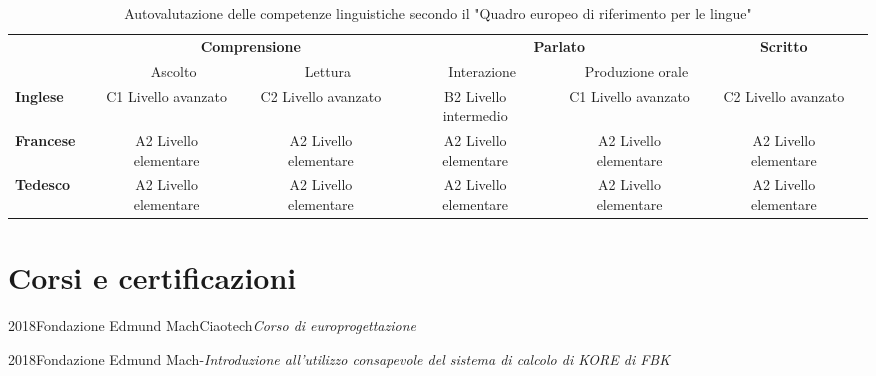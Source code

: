 \documentclass{curriculum}
\begin{document}
        \begin{table}[h]
        \centering
        \fontsize{8}{9}\selectfont
            \begin{tabular}{lccccccccccc}
            \toprule
\multicolumn{2}{c}{} & \multicolumn{4}{c}{\textbf{Comprensione}}                 & \multicolumn{4}{c}{\textbf{Parlato}}                              & \textbf{Scritto} &\\
\multicolumn{2}{c}{} & \multicolumn{2}{c}{Ascolto} & \multicolumn{2}{c}{Lettura} & \multicolumn{2}{c}{Interazione} & \multicolumn{2}{c}{Produzione orale} & &\\
\cmidrule{3-5} \cmidrule{7-9}\cmidrule{11-12}
\textbf{Inglese}  & \phantom{abc} & C1 Livello avanzato   & \phantom{abc} & C2 Livello avanzato   & \phantom{abc} & B2 Livello intermedio &\phantom{abc} & C1 Livello avanzato  & \phantom{abc} & C2 Livello avanzato & \phantom{abc}\\
\textbf{Francese} & \phantom{abc} & A2 Livello elementare & \phantom{abc} & A2 Livello elementare & \phantom{abc} & A2 Livello elementare &\phantom{abc} & A2 Livello elementare & \phantom{abc} & A2 Livello elementare & \phantom{abc}\\
\textbf{Tedesco}  & \phantom{abc} & A2 Livello elementare & \phantom{abc} & A2 Livello elementare & \phantom{abc} & A2 Livello elementare &\phantom{abc} & A2 Livello elementare & \phantom{abc} & A2 Livello elementare & \phantom{abc}\\
            \bottomrule
        \end{tabular}
        \caption*{\small Autovalutazione delle competenze linguistiche secondo il "Quadro europeo di riferimento per le lingue"}
        \end{table}

    
    \section{Corsi e certificazioni}
    
    \begin{entrylist}
    \entry
        {2018}{Fondazione Edmund Mach}{Ciaotech}{\emph{Corso di europrogettazione}}
    \end{entrylist}
    
    \begin{entrylist}
    \entry
        {2018}{Fondazione Edmund Mach}{-}{\emph{Introduzione all'utilizzo consapevole del sistema di calcolo di KORE di FBK}}
    \end{entrylist}
    
\end{document}
